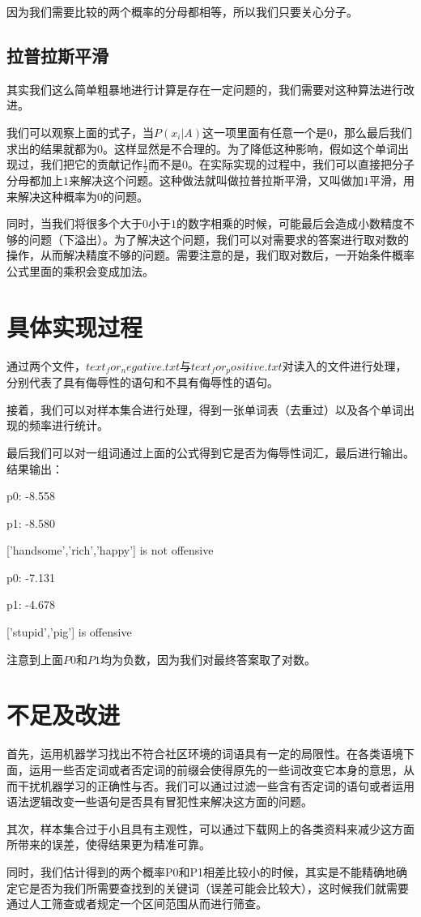 \documentclass[11pt,twoside,a4paper]{article}
\begin{document}
    因为我们需要比较的两个概率的分母都相等，所以我们只要关心分子。

    \subsection{拉普拉斯平滑}
    其实我们这么简单粗暴地进行计算是存在一定问题的，我们需要对这种算法进行改进。


    我们可以观察上面的式子，当$P(x_i|A)$这一项里面有任意一个是$0$，那么最后我们求出的结果就都为$0$。这样显然是不合理的。为了降低这种影响，假如这个单词出现过，我们把它的贡献记作$\frac{1}{2}$而不是$0$。在实际实现的过程中，我们可以直接把分子分母都加上$1$来解决这个问题。这种做法就叫做拉普拉斯平滑，又叫做加$1$平滑，用来解决这种概率为$0$的问题。


    同时，当我们将很多个大于$0$小于$1$的数字相乘的时候，可能最后会造成小数精度不够的问题（下溢出）。为了解决这个问题，我们可以对需要求的答案进行取对数的操作，从而解决精度不够的问题。需要注意的是，我们取对数后，一开始条件概率公式里面的乘积会变成加法。\\

    \section{具体实现过程}
    通过两个文件，$text_for_negative.txt$与$text_for_positive.txt$对读入的文件进行处理，分别代表了具有侮辱性的语句和不具有侮辱性的语句。


    接着，我们可以对样本集合进行处理，得到一张单词表（去重过）以及各个单词出现的频率进行统计。


    最后我们可以对一组词通过上面的公式得到它是否为侮辱性词汇，最后进行输出。
    结果输出：
    
    \begin{center}
        p0: -8.558

        p1: -8.580

        ['handsome','rich','happy'] is not offensive

        p0: -7.131

        p1: -4.678

        ['stupid','pig'] is offensive
    \end{center}

    注意到上面$P0$和$P1$均为负数，因为我们对最终答案取了对数。

    \section{不足及改进}
    首先，运用机器学习找出不符合社区环境的词语具有一定的局限性。在各类语境下面，运用一些否定词或者否定词的前缀会使得原先的一些词改变它本身的意思，从而干扰机器学习的正确性与否。我们可以通过过滤一些含有否定词的语句或者运用语法逻辑改变一些语句是否具有冒犯性来解决这方面的问题。


    其次，样本集合过于小且具有主观性，可以通过下载网上的各类资料来减少这方面所带来的误差，使得结果更为精准可靠。


    同时，我们估计得到的两个概率P0和P1相差比较小的时候，其实是不能精确地确定它是否为我们所需要查找到的关键词（误差可能会比较大），这时候我们就需要通过人工筛查或者规定一个区间范围从而进行筛查。
\end{document}
